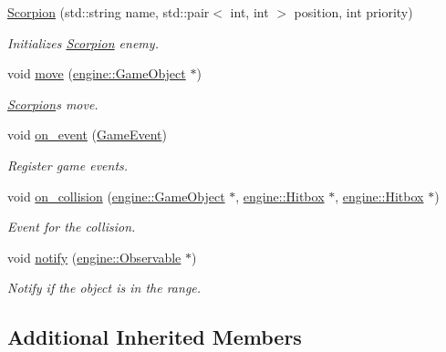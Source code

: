 \begin{DoxyCompactItemize}
\item 
\hyperlink{classmindscape_1_1_scorpion_a4177d8e6e1dc80f806d081341cfdfbf9}{Scorpion} (std\+::string name, std\+::pair$<$ int, int $>$ position, int priority)
\begin{DoxyCompactList}\small\item\em Initializes \hyperlink{classmindscape_1_1_scorpion}{Scorpion} enemy. \end{DoxyCompactList}\item 
void \hyperlink{classmindscape_1_1_scorpion_af5dc16c6dce9db3cc266a9ba59b4c0a9}{move} (\hyperlink{classengine_1_1_game_object}{engine\+::\+Game\+Object} $\ast$)
\begin{DoxyCompactList}\small\item\em \hyperlink{classmindscape_1_1_scorpion}{Scorpion}\textquotesingle{}s move. \end{DoxyCompactList}\item 
void \hyperlink{classmindscape_1_1_scorpion_a5e0aa8fda5f9e6264beb428368077da9}{on\+\_\+event} (\hyperlink{class_game_event}{Game\+Event})
\begin{DoxyCompactList}\small\item\em Register game events. \end{DoxyCompactList}\item 
void \hyperlink{classmindscape_1_1_scorpion_ab1b64d05f6f0280830132ddf46d13242}{on\+\_\+collision} (\hyperlink{classengine_1_1_game_object}{engine\+::\+Game\+Object} $\ast$, \hyperlink{classengine_1_1_hitbox}{engine\+::\+Hitbox} $\ast$, \hyperlink{classengine_1_1_hitbox}{engine\+::\+Hitbox} $\ast$)
\begin{DoxyCompactList}\small\item\em Event for the collision. \end{DoxyCompactList}\item 
void \hyperlink{classmindscape_1_1_scorpion_aaa94c9c620ff2fe58e8315ac1112aeb5}{notify} (\hyperlink{classengine_1_1_observable}{engine\+::\+Observable} $\ast$)
\begin{DoxyCompactList}\small\item\em Notify if the object is in the range. \end{DoxyCompactList}\end{DoxyCompactItemize}
\subsection*{Additional Inherited Members}


